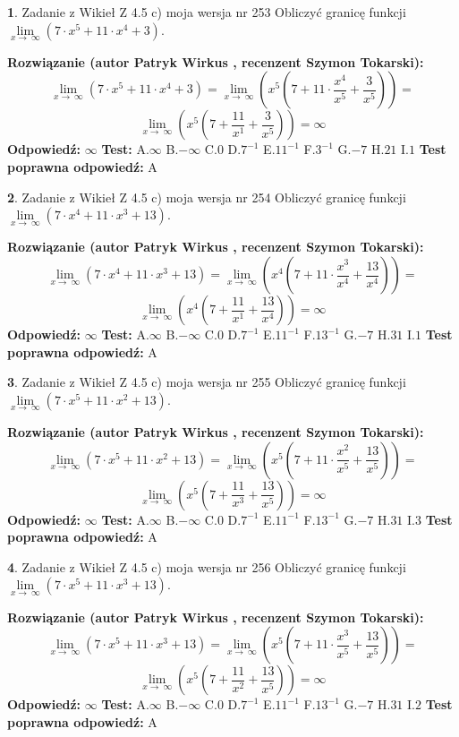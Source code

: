 \documentclass[12pt, a4paper]{article}
\theoremstyle{definition} %
\newtheorem{zad}{}
\newcommand{\zadStart}[1]{\begin{zad}#1\newline}
\newcommand{\zadStop}{\end{zad}}
\newcommand{\rozwStart}[2]{\noindent \textbf{Rozwiązanie (autor #1 , recenzent #2): }\newline}
\newcommand{\rozwStop}{\newline}
\newcommand{\odpStart}{\noindent \textbf{Odpowiedź:}\newline}
\newcommand{\odpStop}{\newline}
\newcommand{\testStart}{\noindent \textbf{Test:}\newline}
\newcommand{\testStop}{\newline}
\newcommand{\kluczStart}{\noindent \textbf{Test poprawna odpowiedź:}\newline}
\newcommand{\kluczStop}{\newline}
\begin{document}
\zadStart{Zadanie z Wikieł Z 4.5 c) moja wersja nr 253}
Obliczyć granicę funkcji  $\lim\limits_{x\to\ \infty}(7 \cdot x^{5}+11 \cdot x^{4}+3)$.
\zadStop
\rozwStart{Patryk Wirkus}{Szymon Tokarski}
$$\lim\limits_{x\to\ \infty}(7 \cdot x^{5}+11 \cdot x^{4}+3) = \lim\limits_{x\to\ \infty}(x^{5}(7 +11 \cdot \frac{x^{4}}{x^{5}}+\frac{3}{x^{5}})) =$$ $$\lim\limits_{x\to\ \infty}(x^{5}(7 +\frac{11}{x^{1}}+\frac{3}{x^{5}})) =\infty$$
\rozwStop
\odpStart
$\infty$
\odpStop
\testStart
A.$\infty$ B.$-\infty$ C.$0$ D.$7^{-1}$ E.$11^{-1}$
F.$3^{-1}$ G.$-7$
H.$21$
I.$1$
\testStop
\kluczStart
A
\kluczStop



\zadStart{Zadanie z Wikieł Z 4.5 c) moja wersja nr 254}
Obliczyć granicę funkcji  $\lim\limits_{x\to\ \infty}(7 \cdot x^{4}+11 \cdot x^{3}+13)$.
\zadStop
\rozwStart{Patryk Wirkus}{Szymon Tokarski}
$$\lim\limits_{x\to\ \infty}(7 \cdot x^{4}+11 \cdot x^{3}+13) = \lim\limits_{x\to\ \infty}(x^{4}(7 +11 \cdot \frac{x^{3}}{x^{4}}+\frac{13}{x^{4}})) =$$ $$\lim\limits_{x\to\ \infty}(x^{4}(7 +\frac{11}{x^{1}}+\frac{13}{x^{4}})) =\infty$$
\rozwStop
\odpStart
$\infty$
\odpStop
\testStart
A.$\infty$ B.$-\infty$ C.$0$ D.$7^{-1}$ E.$11^{-1}$
F.$13^{-1}$ G.$-7$
H.$31$
I.$1$
\testStop
\kluczStart
A
\kluczStop



\zadStart{Zadanie z Wikieł Z 4.5 c) moja wersja nr 255}
Obliczyć granicę funkcji  $\lim\limits_{x\to\ \infty}(7 \cdot x^{5}+11 \cdot x^{2}+13)$.
\zadStop
\rozwStart{Patryk Wirkus}{Szymon Tokarski}
$$\lim\limits_{x\to\ \infty}(7 \cdot x^{5}+11 \cdot x^{2}+13) = \lim\limits_{x\to\ \infty}(x^{5}(7 +11 \cdot \frac{x^{2}}{x^{5}}+\frac{13}{x^{5}})) =$$ $$\lim\limits_{x\to\ \infty}(x^{5}(7 +\frac{11}{x^{3}}+\frac{13}{x^{5}})) =\infty$$
\rozwStop
\odpStart
$\infty$
\odpStop
\testStart
A.$\infty$ B.$-\infty$ C.$0$ D.$7^{-1}$ E.$11^{-1}$
F.$13^{-1}$ G.$-7$
H.$31$
I.$3$
\testStop
\kluczStart
A
\kluczStop



\zadStart{Zadanie z Wikieł Z 4.5 c) moja wersja nr 256}
Obliczyć granicę funkcji  $\lim\limits_{x\to\ \infty}(7 \cdot x^{5}+11 \cdot x^{3}+13)$.
\zadStop
\rozwStart{Patryk Wirkus}{Szymon Tokarski}
$$\lim\limits_{x\to\ \infty}(7 \cdot x^{5}+11 \cdot x^{3}+13) = \lim\limits_{x\to\ \infty}(x^{5}(7 +11 \cdot \frac{x^{3}}{x^{5}}+\frac{13}{x^{5}})) =$$ $$\lim\limits_{x\to\ \infty}(x^{5}(7 +\frac{11}{x^{2}}+\frac{13}{x^{5}})) =\infty$$
\rozwStop
\odpStart
$\infty$
\odpStop
\testStart
A.$\infty$ B.$-\infty$ C.$0$ D.$7^{-1}$ E.$11^{-1}$
F.$13^{-1}$ G.$-7$
H.$31$
I.$2$
\testStop
\kluczStart
A
\kluczStop
\end{document}
